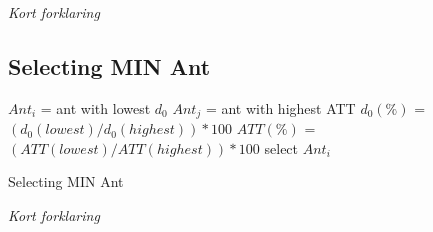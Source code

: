 \emph{\color{red} Kort forklaring }

\subsection{Selecting MIN Ant}
\begin{algorithm}[H]
$Ant_{i}$ = ant with lowest $d_0$\;
$Ant_{j}$ = ant with highest ATT\;
{
	$d_0(\%)$ = $(d_0(lowest) / d_0(highest))*100$\;
	$ATT(\%)$ = $(ATT(lowest) / ATT(highest))*100$\;
	{
		select $Ant_{i}$
	}
}
 \caption{Selecting MIN Ant}
\end{algorithm}
\emph{\color{red} Kort forklaring }
